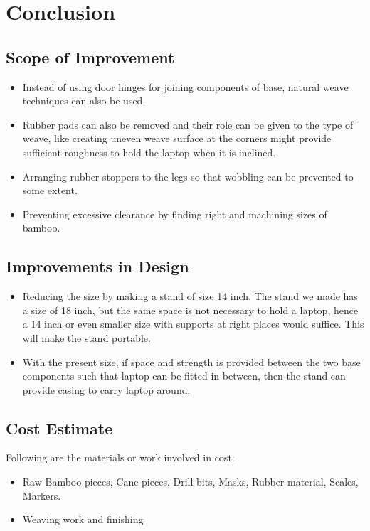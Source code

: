 \chapter{Conclusion}

\section{Scope of Improvement}

\begin{itemize}
\item Instead of using door hinges for joining components of base, natural weave techniques can also be used.
\item Rubber pads can also be removed and their role can be given to the type of weave, like creating uneven weave surface at the corners might provide sufficient roughness to hold the laptop when it is inclined.
\item Arranging rubber stoppers to the legs so that wobbling can be prevented to some extent.
\item Preventing excessive clearance by finding right and machining sizes of bamboo.
\end{itemize}

\section{Improvements in Design}

\begin{itemize}
\item Reducing the size by making a stand of size 14 inch. The stand we made has a size of 18 inch, but the same space is not necessary to hold a laptop, hence a 14 inch or even smaller size with supports at right places would suffice. This will make the stand portable.
\item With the present size, if space and strength is provided between the two base components such that laptop can be fitted in between, then the stand can provide casing to carry laptop around.

\end{itemize}

\section{Cost Estimate}

Following are the materials or work involved in cost:
\begin{itemize}
\item Raw Bamboo pieces, Cane pieces, Drill bits, Masks, Rubber material, Scales, Markers.
\item Weaving work and finishing
\end{itemize}


